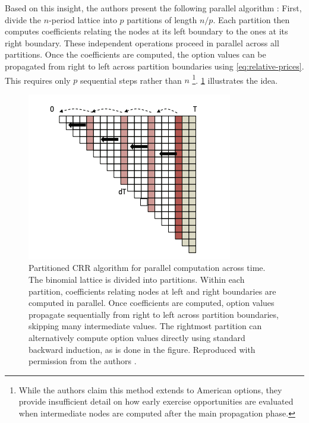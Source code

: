 \documentclass[english,12pt,a4paper,pdftex,sci,utf8]{aaltothesis}
\begin{document}
Based on this insight, the authors present the following parallel algorithm \cite{ganesan2009acceleration}: First, divide the $n$-period lattice into $p$ partitions of length $n/p$. Each partition then computes coefficients relating the nodes at its left boundary to the ones at its right boundary. These independent operations proceed in parallel across all partitions. Once the coefficients are computed, the option values can be propagated from right to left across partition boundaries using \cref{eq:relative-prices}. This requires only $p$ sequential steps rather than $n$ \footnote{While the authors claim this method extends to American options, they provide insufficient detail on how early exercise opportunities are evaluated when intermediate nodes are computed after the main propagation phase.}. \cref{fig:partitioned} illustrates the idea.

\begin{figure}[h]
    \centering
    \includegraphics[scale=0.6]{External Images/CRRpartitioned.png}
    \caption{Partitioned CRR algorithm for parallel computation across time. The binomial lattice is divided into partitions. Within each partition, coefficients relating nodes at left and right boundaries are computed in parallel. Once coefficients are computed, option values propagate sequentially from right to left across partition boundaries, skipping many intermediate values. The rightmost partition can alternatively compute option values directly using standard backward induction, as is done in the figure. Reproduced with permission from the authors \cite{ganesan2009acceleration}.}

    \label{fig:partitioned}
\end{figure}
\end{document}
